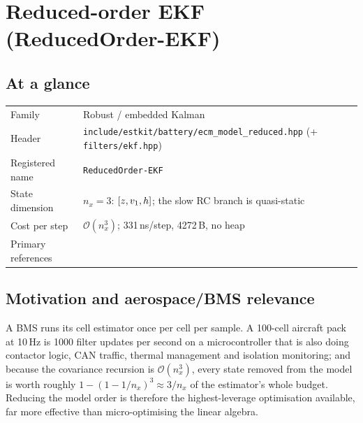 \providecommand{\vf}{\bm{f}} \providecommand{\vh}{\bm{h}}
\providecommand{\vd}{\bm{d}} \providecommand{\mM}{\bm{M}}
\providecommand{\va}{\bm{a}} \providecommand{\vb}{\bm{b}}

\chapter{Reduced-order EKF (ReducedOrder-EKF)}
\label{ch:reducedorderekf}

\section*{At a glance}
\begin{tabular}{@{}l>{\raggedright\arraybackslash}p{}@{}}
Family & Robust / embedded Kalman \\
Header & \texttt{include/estkit/battery/ecm\_model\_reduced.hpp}
         (+ \texttt{filters/ekf.hpp}) \\
Registered name & \texttt{ReducedOrder-EKF} \\
State dimension & $n_x = 3$: $[z, v_1, h]$; the slow RC branch is quasi-static \\
Cost per step & $\mathcal{O}(n_x^3)$; 331\,ns/step, 4272\,B, no heap \\
Primary references & \cite{simon2006,plett2016bms2,plett2004ekf2,chen2020parameterization} \\
\end{tabular}

\section{Motivation and aerospace/BMS relevance}
A BMS runs its cell estimator once per cell per sample.  A 100-cell aircraft pack at 10\,Hz is
1000 filter updates per second on a microcontroller that is also doing contactor logic, CAN
traffic, thermal management and isolation monitoring; and because the covariance recursion is
$\mathcal{O}(n_x^3)$, every state removed from the model is worth roughly
$1-(1-1/n_x)^3\approx 3/n_x$ of the estimator's whole budget.  Reducing the model order is
therefore the highest-leverage optimisation available, far more effective than micro-optimising the
linear algebra.

